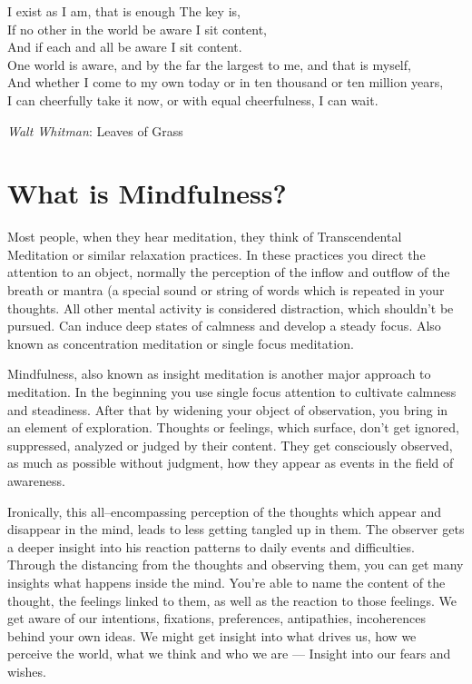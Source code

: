 \documentclass[../Book.Stress_regulation.tex]{subfiles}
\begin{document}
\setlength{}

 \epigraph{I exist as I am, that is enough
The key is, \\
If no other in the world be aware I sit content,\\
And if each and all be aware I sit content.\\
One world is aware, and by the far the largest to me, and that is myself,\\
And whether I come to my own today or in ten thousand or ten million years,\\
I can cheerfully take it now, or with equal cheerfulness, I can wait.}{\textit{Walt Whitman}: Leaves of Grass}
\setlength{}
\section{What is Mindfulness?}

Most people, when they hear meditation, they think of {Transcendental Meditation\texttrademark} or similar relaxation practices.
In these practices you  {direct the attention to an object}, normally the perception of the inflow and outflow of the {breath or mantra} (a special sound or string of words which is repeated in your thoughts.
All other mental activity is considered {distraction}, which shouldn't be pursued.
Can induce deep states of {calmness} and {develop a steady focus}.
Also known as concentration meditation or {single focus meditation}.   

Mindfulness, also known as {insight meditation} is another major approach to meditation.
In the beginning you use single focus attention to cultivate calmness and steadiness.
After that by {widening your object of observation}, you bring in an element of exploration.
{Thoughts or feelings}, which surface, don't get ignored, suppressed, analyzed or judged by their content.
They get consciously {observed}, as much as possible {without judgment}, how they appear as events in the field of awareness.



Ironically, this all--encompassing perception of the thoughts which appear and disappear in the mind, leads to {less getting tangled up} in them.
The observer gets a {deeper insight} into his reaction patterns to daily events and difficulties.
Through the distancing from the thoughts and observing them, you can get many insights what happens {inside the mind}.
You're able to {name the content} of the thought, the feelings linked to them, as well as the reaction to those feelings.
We get aware of our intentions, fixations, preferences, antipathies, incoherences behind your own ideas. We might get insight into what drives us, how we perceive the world, what we think and who we are ---
Insight into our fears and wishes.
\end{document}
